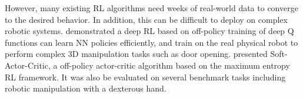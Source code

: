 However, many existing RL algorithms need weeks of real-world data to converge to the desired behavior. In addition, this can be difficult to deploy on complex robotic systems. \citep{reinforcementl} demonstrated a deep RL based on off-policy training of deep Q functions can learn NN policies efficiently, and train on the real physical robot to perform complex 3D manipulation tasks such as door opening. \citep{drlsac} presented Soft-Actor-Critic, a off-policy actor-critic algorithm based on the maximum entropy RL framework. It was also be evaluated on several benchmark tasks including robotic manipulation with a dexterous hand.


